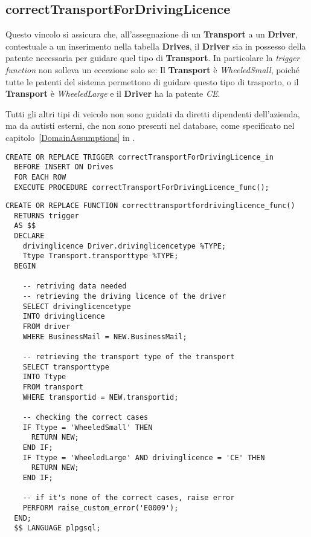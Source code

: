 \subsection{\textbf{correctTransportForDrivingLicence}}

Questo vincolo si assicura che, all'assegnazione di un \textbf{Transport} a un \textbf{Driver}, contestuale a un inserimento nella tabella \textbf{Drives}, il \textbf{Driver} sia in possesso della patente necessaria per guidare quel tipo di \textbf{Transport}.
In particolare la \textit{trigger function} non solleva un eccezione solo se:
 Il \textbf{Transport} è \textit{WheeledSmall}, poiché tutte le patenti del sistema permettono di guidare questo tipo di trasporto, o il \textbf{Transport} è \textit{WheeledLarge} e il \textbf{Driver} ha la patente \textit{CE}.

Tutti gli altri tipi di veicolo non sono guidati da diretti dipendenti dell'azienda, ma da autisti esterni, che non sono presenti nel database, come specificato nel capitolo~\ref{DomainAssumptions} in .

\begin{lstlisting}[caption={Trigger per il vincolo \textbf{correctTransportForDrivingLicence}}]
  CREATE OR REPLACE TRIGGER correctTransportForDrivingLicence_in
  BEFORE INSERT ON Drives
  FOR EACH ROW
  EXECUTE PROCEDURE correctTransportForDrivingLicence_func();
\end{lstlisting}

\begin{lstlisting}[caption={Funzione per il vincolo \textbf{correctTransportForDrivingLicence}}]
  CREATE OR REPLACE FUNCTION correcttransportfordrivinglicence_func() 
  RETURNS trigger
  AS $$
  DECLARE
    drivinglicence Driver.drivinglicencetype %TYPE;
    Ttype Transport.transporttype %TYPE;
  BEGIN

    -- retriving data needed
    -- retrieving the driving licence of the driver
    SELECT drivinglicencetype
    INTO drivinglicence
    FROM driver
    WHERE BusinessMail = NEW.BusinessMail;

    -- retrieving the transport type of the transport
    SELECT transporttype
    INTO Ttype
    FROM transport
    WHERE transportid = NEW.transportid;

    -- checking the correct cases
    IF Ttype = 'WheeledSmall' THEN
      RETURN NEW;
    END IF;
    IF Ttype = 'WheeledLarge' AND drivinglicence = 'CE' THEN
      RETURN NEW;
    END IF;

    -- if it's none of the correct cases, raise error
    PERFORM raise_custom_error('E0009');
  END;
  $$ LANGUAGE plpgsql;
\end{lstlisting}


